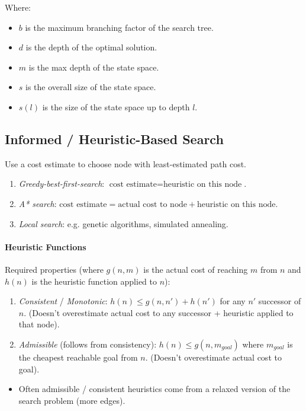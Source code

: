 \documentclass[twocolumn,english]{article}
\begin{document}
Where:
\begin{itemize}
\item $b$ is the maximum branching factor of the search tree.
\item $d$ is the depth of the optimal solution.
\item $m$ is the max depth of the state space.
\item $s$ is the overall size of the state space.
\item $s\left(l\right)$ is the size of the state space up to depth $l$.
\end{itemize}

\subsection{Informed / Heuristic-Based Search}

Use a cost estimate to choose node with least-estimated path cost.
\begin{enumerate}
\item \emph{Greedy-best-first-search}: $\text{cost estimate}=\text{heuristic on this node}$.
\item \emph{A{*} search}: $\text{cost estimate}=\text{actual cost to node}+\text{heuristic on this node}$.
\item \emph{Local search}: e.g. genetic algorithms, simulated annealing.
\end{enumerate}

\paragraph{Heuristic Functions}

Required properties (where $g\left(n,m\right)$ is the actual cost
of reaching $m$ from $n$ and $h\left(n\right)$ is the heuristic
function applied to $n$):
\begin{enumerate}
\item \emph{Consistent} / \emph{Monotonic}: $h\left(n\right)\leq g\left(n,n'\right)+h\left(n'\right)$
for any $n'$ successor of $n$. (Doesn't overestimate actual cost
to any successor + heuristic applied to that node).
\item \emph{Admissible} (follows from consistency): $h\left(n\right)\leq g\left(n,m_{goal}\right)$
where $m_{goal}$ is the cheapest reachable goal from $n$. (Doesn't
overestimate actual cost to goal).
\end{enumerate}
\begin{itemize}
\item Often admissible / consistent heuristics come from a relaxed version
of the search problem (more edges).
\end{itemize}
\end{document}
